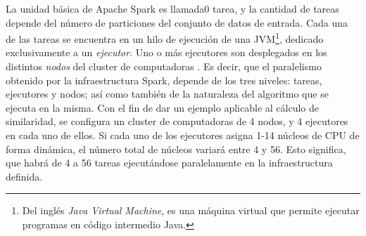 \bigskip La unidad básica de Apache Spark es llamada0 tarea, y la cantidad de tareas depende del número de particiones del conjunto de datos de entrada. Cada una de las tareas se encuentra en un hilo de ejecución de una JVM\footnote{Del inglés \textit{Java Virtual Machine}, es una máquina virtual que permite ejecutar programas en código intermedio Java.}, dedicado exclusivamente a un \textit{ejecutor}. Uno o más ejecutores son desplegados en los distintos \textit{nodos} del cluster de computadoras \citep{janardhanan2020optimum}. Es decir, que el paralelismo obtenido por la infraestructura Spark, depende de los tres niveles: tareas, ejecutores y nodos; así como también de la naturaleza del algoritmo que se ejecuta en la misma. Con el fin de dar un ejemplo aplicable al cálculo de similaridad, se configura un cluster de computadoras de 4 nodos, y 4 ejecutores en cada uno de ellos. Si cada uno de los ejecutores asigna 1-14 núcleos de CPU de forma dinámica, el número total de núcleos variará entre 4 y 56. Esto significa, que habrá de 4 a 56 tareas ejecutándose paralelamente en la infraestructura definida.
